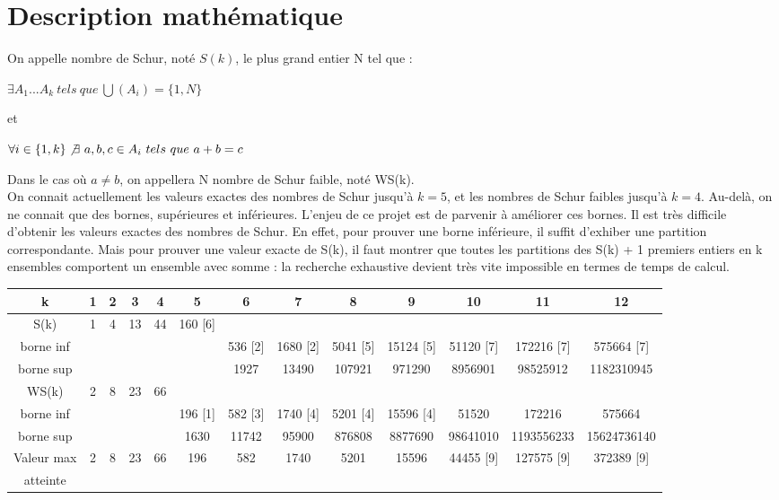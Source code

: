 \documentclass{report}
\begin{document}
\section{Description mathématique}
On appelle nombre de Schur, noté $S(k)$, le plus grand entier N tel que :
\begin{center}
    
$ \exists A_1... A_k \ tels \ que \ \bigcup(A_i) = \{1,N\} $

et

$\forall i\in \{1,k\} \not\exists \ a,b,c\in A_i \ tels \  que \ a+b=c  $

\end{center}
Dans le cas où $a \neq b$, on appellera N nombre de Schur faible, noté WS(k).
\\
On connait actuellement les valeurs exactes des nombres de Schur jusqu'à $k = 5$, et les nombres de Schur faibles jusqu'à $k = 4$. Au-delà, on ne connait que des bornes, supérieures et inférieures. L'enjeu de ce projet est de parvenir à améliorer ces bornes. Il est très difficile d'obtenir les valeurs exactes des nombres de Schur. En effet, pour prouver une borne inférieure, il suffit d'exhiber une partition correspondante. Mais pour prouver une valeur exacte de S(k), il faut montrer que toutes les partitions des S(k) + 1 premiers entiers en k ensembles comportent un ensemble avec somme : la recherche exhaustive devient très vite impossible en termes de temps de calcul.
\\


\begin{tabular}{c|c|c|c|c|c|c|c|c|c|c|c|c}
    \hline
    k & 1 & 2 & 3 & 4 & 5 & 6 & 7 & 8 & 9 & 10 & 11 & 12 \\ \hline
    S(k) & 1 & 4 & 13 & 44 & 160 [6] &  &  &  &  &  &  & \\
    borne inf &  &  &  &  &  & 536 [2] & 1680 [2] & 5041 [5] & 15124 [5] & 51120 [7] & 172216 [7] & 575664 [7] \\ 
    borne sup &  &  &  &  &  & 1927 & 13490 & 107921 & 971290 & 8956901 & 98525912 & 1182310945 \\ \hline
    WS(k) & 2 & 8 & 23 & 66 &  &  &  &  &  &  &  &  \\ 
    borne inf &  &  &  &  & 196 [1] & 582 [3] & 1740 [4] & 5201 [4] & 15596 [4] & 51520 & 172216 & 575664 \\
    borne sup &  &  &  &  & 1630 & 11742 & 95900 & 876808 & 8877690 & 98641010 & 1193556233 & 15624736140 \\ \hline
    
    Valeur max & 2 & 8 & 23 & 66 & 196 & 582 & 1740 & 5201 & 15596 & 44455 [9] & 127575 [9] & 372389 [9] \\ 
    atteinte &  &  &  &  &  &  &  &  &  &  &  &  \\ \hline
    
\end{tabular}
\\
\end{document}
